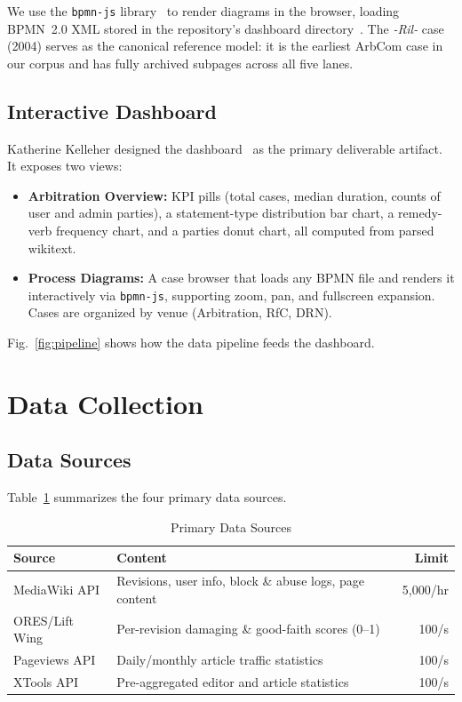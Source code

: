 \documentclass[conference]{IEEEtran}
\begin{document}
We use the \texttt{bpmn-js} library~\cite{b_bpmnjs} to render diagrams in the
browser, loading BPMN~2.0 XML stored in the repository's dashboard
directory~\cite{b_repo}. The \textit{-Ril-}
case (2004) serves as the canonical reference model: it is the earliest ArbCom
case in our corpus and has fully archived subpages across all five lanes.

\subsection{Interactive Dashboard}

Katherine Kelleher designed the dashboard~\cite{b_dashboard} as the primary
deliverable artifact. It exposes two views:

\begin{itemize}
  \item \textbf{Arbitration Overview:} KPI pills (total cases, median
        duration, counts of user and admin parties), a statement-type
        distribution bar chart, a remedy-verb frequency chart, and a
        parties donut chart, all computed from parsed wikitext.
  \item \textbf{Process Diagrams:} A case browser that loads any BPMN
        file and renders it interactively via \texttt{bpmn-js}, supporting
        zoom, pan, and fullscreen expansion. Cases are organized by venue
        (Arbitration, RfC, DRN).
\end{itemize}

Fig.~\ref{fig:pipeline} shows how the data pipeline feeds the dashboard.

\section{Data Collection}

\subsection{Data Sources}

Table~\ref{tab:datasources} summarizes the four primary data sources.

\begin{table}[tb]
\caption{Primary Data Sources}
\label{tab:datasources}
\begin{tabularx}{\columnwidth}{@{}l X r@{}}
\toprule
\textbf{Source} & \textbf{Content} & \textbf{Limit} \\
\midrule
MediaWiki API  & Revisions, user info, block \& abuse logs, page content & 5{,}000/hr \\
ORES/Lift Wing & Per-revision damaging \& good-faith scores (0--1) & 100/s \\
Pageviews API  & Daily/monthly article traffic statistics & 100/s \\
XTools API     & Pre-aggregated editor and article statistics & 100/s \\
\bottomrule
\end{tabularx}
\end{table}
\end{document}
